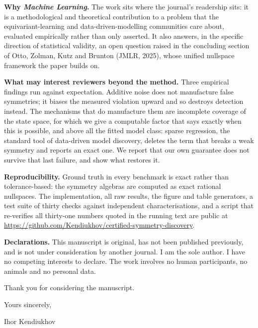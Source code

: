 \documentclass[11pt,a4paper]{article}
\begin{document}
\textbf{Why \emph{Machine Learning}.} The work sits where the journal's
readership sits: it is a methodological and theoretical contribution to a
problem that the equivariant-learning and data-driven-modelling communities
care about, evaluated empirically rather than only asserted. It also answers, in
the specific direction of statistical validity, an open question raised in the
concluding section of Otto, Zolman, Kutz and Brunton (JMLR, 2025), whose unified
nullspace framework the paper builds on.

\textbf{What may interest reviewers beyond the method.} Three empirical findings
run against expectation. Additive noise does not manufacture false symmetries;
it biases the measured violation upward and so destroys detection instead. The
mechanisms that do manufacture them are incomplete coverage of the state space,
for which we give a computable factor that says exactly when this is possible,
and above all the fitted model class: sparse regression, the standard tool of
data-driven model discovery, deletes the term that breaks a weak symmetry and
reports an exact one. We report that our own guarantee does not survive that
last failure, and show what restores it.

\textbf{Reproducibility.} Ground truth in every benchmark is exact rather than
tolerance-based: the symmetry algebras are computed as exact rational nullspaces.
The implementation, all raw results, the figure and table generators, a test
suite of thirty checks against independent characterisations, and a script that
re-verifies all thirty-one numbers quoted in the running text are public at
\url{https://github.com/Kendiukhov/certified-symmetry-discovery}.

\textbf{Declarations.} This manuscript is original, has not been published
previously, and is not under consideration by another journal. I am the sole
author. I have no competing interests to declare. The work involves no human
participants, no animals and no personal data.

Thank you for considering the manuscript.

\vspace{1em}

Yours sincerely,

\vspace{1.5em}

Ihor Kendiukhov
\end{document}
